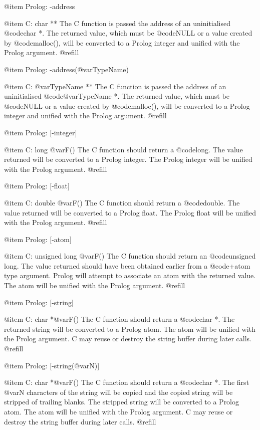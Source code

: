 @item Prolog: -address

@item C:      char **
The C function is passed the address of an uninitialised @code{char *}.
The returned value, which must be @code{NULL} or a value created by
@code{malloc()}, will be converted to a Prolog integer and unified with
the Prolog argument. @refill

@item Prolog: -address(@var{TypeName})

@item C:      @var{TypeName} **
The C function is passed the address of an uninitialised
@code{@var{TypeName} *}.  The returned value, which must be @code{NULL}
or a value created by @code{malloc()}, will be converted to a Prolog
integer and unified with the Prolog argument. @refill

@item Prolog: [-integer]

@item C:      long @var{F}()
The C function should return a @code{long}.  The value returned will be
converted to a Prolog integer.  The Prolog integer will be unified with
the Prolog argument. @refill

@item Prolog: [-float]

@item C:      double @var{F}()
The C function should return a @code{double}.  The value returned will
be converted to a Prolog float.  The Prolog float will be unified with
the Prolog argument. @refill

@item Prolog: [-atom]

@item C:      unsigned long @var{F}()
The C function should return an @code{unsigned long}.  The value
returned should have been obtained earlier from a @code{+atom} type
argument.  Prolog will attempt to associate an atom with the returned
value.  The atom will be unified with the Prolog argument. @refill

@item Prolog: [-string]

@item C:      char *@var{F}()
The C function should return a @code{char *}.  The returned string will
be converted to a Prolog atom.  The atom will be unified with the Prolog
argument.  C may reuse or destroy the string buffer during later calls.
@refill

@item Prolog: [-string(@var{N})]

@item C:      char *@var{F}()
The C function should return a @code{char *}.  The first @var{N}
characters of the string will be copied and the copied string will be
stripped of trailing blanks.  The stripped string will be converted to a
Prolog atom.  The atom will be unified with the Prolog argument.  C may
reuse or destroy the string buffer during later calls. @refill

